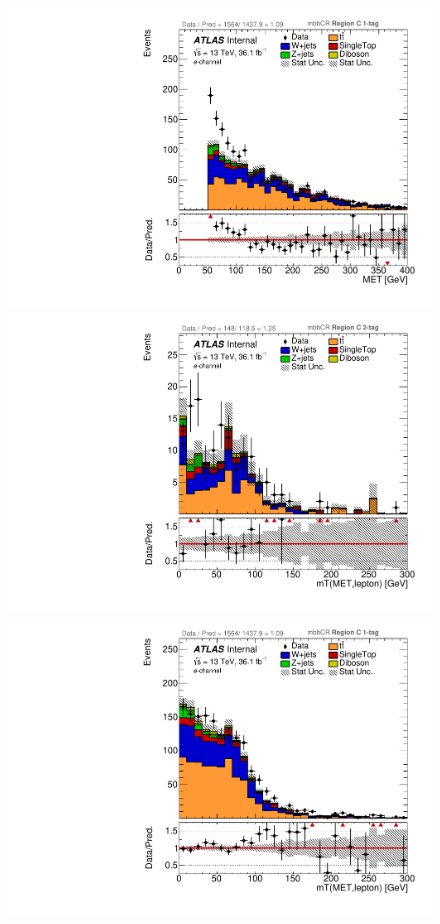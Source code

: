 \begin{figure}[!htbp]
\begin{center}
\includegraphics[scale=0.33]{./figures/boosted/ABCD_ScaledPrompt/elec_mbbcr_RegionC_1tag_MET}\\
\includegraphics[scale=0.33]{./figures/boosted/ABCD_ScaledPrompt/elec_mbbcr_RegionC_WlepMtATLAS}
\includegraphics[scale=0.33]{./figures/boosted/ABCD_ScaledPrompt/elec_mbbcr_RegionC_1tag_WlepMtATLAS}\\

\end{center}
\end{figure}
